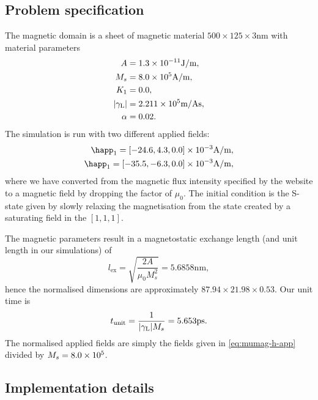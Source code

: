 \subsection{Problem specification}

The magnetic domain is a sheet of magnetic material $500 \times 125 \times 3$nm with material parameters
\begin{equation}
  \begin{aligned}
    A &= 1.3\times 10^{-11} \text{J/m}, \\
    M_s &= 8.0\times 10^{5} \text{A/m}, \\
    K_1 &= 0.0, \\
    {\left|{\gamma_{\mathrm{\tiny{L}}}} \right|} &= 2.211 \times 10^{5} \text{m/As}, \\
    \alpha &= 0.02.
  \end{aligned}
\end{equation}
The simulation is run with two different applied fields:
\begin{equation}
  \begin{aligned}
    \happ_1 = [-24.6, 4.3, 0.0] \E{-3}\text{A/m}, \\
    \happ_1 = [-35.5, -6.3, 0.0] \E{-3}\text{A/m}, \\
  \end{aligned}
  \label{eq:mumag-h-app}
\end{equation}
where we have converted from the magnetic flux intensity specified by the \mumag website to a magnetic field by dropping the factor of $\mu_0$.
The initial condition is the S-state given by slowly relaxing the magnetisation from the state created by a saturating field in the $[1,1,1]$.

The magnetic parameters result in a magnetostatic exchange length (and unit length in our simulations) of
\begin{equation}
  l_{\text{ex}} = \sqrt{\frac{2A}{\mu_0 M_s^2}} = 5.6858\text{nm},
\end{equation}
hence the normalised dimensions are approximately $87.94 \times 21.98 \times 0.53$.
Our unit time is
\begin{equation}
  t_{\text{unit}} = \frac{1}{{\left|{\gamma_{\mathrm{\tiny{L}}}} \right|} M_s} = 5.653\text{ps}.
\end{equation}
The normalised applied fields are simply the fields given in \cref{eq:mumag-h-app} divided by $M_s = 8.0\times 10^{5}$.


\subsection{Implementation details}

